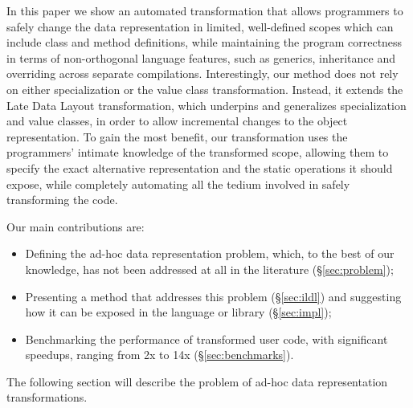 In this paper we show an automated transformation that allows programmers to safely change the data representation in limited, well-defined scopes which can include class and method definitions, while maintaining the program correctness in terms of non-orthogonal language features, such as generics, inheritance and overriding across separate compilations. Interestingly, our method does not rely on either specialization or the value class transformation. Instead, it extends the Late Data Layout transformation, which underpins and generalizes specialization and value classes, in order to allow incremental changes to the object representation. To gain the most benefit, our transformation uses the programmers' intimate knowledge of the transformed scope, allowing them to specify the exact alternative representation and the static operations it should expose, while completely automating all the tedium involved in safely transforming the code.

Our main contributions are:
\begin{itemize}
  \item Defining the ad-hoc data representation problem, which, to the best of our knowledge, has not been addressed at all in the literature (\S\ref{sec:problem});
  \item Presenting a method that addresses this problem (\S\ref{sec:ildl}) and suggesting how it can be exposed in the language or library (\S\ref{sec:impl});
  \item Benchmarking the performance of transformed user code, with significant speedups, ranging from 2x to 14x (\S\ref{sec:benchmarks}).
\end{itemize}

The following section will describe the problem of ad-hoc data representation transformations.
